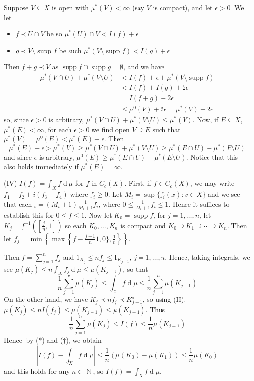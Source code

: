 \documentclass[11pt, a4paper]{memoir}
\DeclareMathOperator{\N}{{\mathbb{N}}}
\newcommand{\ol}[1]{\ensuremath{\overline{#1}}}
\theoremstyle{change}
\theoremstyle{plain}
\theoremstyle{nonumberplain}
\DeclareMathOperator{\supp}{supp}
\renewcommand{\d}[1]{\ensuremath{\operatorname{d}\!{#1}}}
\numberwithin{equation}{section}
\begin{document}
Suppose $V\subseteq X$ is open with $\mu^*(V)<\infty$ (say $\ol{V}$ is compact), and let $\epsilon>0$.
We let
\begin{itemize}[nl]
    \item $f\prec U\cap V$ be so $\mu^*(U)\cap V<I(f)+\epsilon$
    \item $g\prec V\setminus\supp f$ be such $\mu^*(V\setminus\supp f)< I(g)+\epsilon$
\end{itemize}
Then $f+g\prec V$ as $\supp f\cap\supp g=\emptyset$, and we have
\begin{align*}
    \mu^*(V\cap U)+\mu^*(V\setminus U) &< I(f)+\epsilon+\mu^*(V\setminus\supp f)\\
                                       &< I(f)+I(g)+2\epsilon\\
                                       &= I(f+g)+2\epsilon\\
                                       &\leq \mu^0(V)+2\epsilon=\mu^*(V)+2\epsilon
\end{align*}
so, since $\epsilon>0$ is arbitrary, $\mu^*(V\cap U)+\mu^*(V\setminus U)\leq\mu^*(V)$.
Now, if $E\subseteq X$, $\mu^*(E)<\infty$, for each $\epsilon>0$ we find open $V\supseteq E$ such that $\mu^*(V)=\mu^0(E)<\mu^*(E)+\epsilon$.
Then
\begin{equation*}
    \mu^*(E)+\epsilon > \mu^*(V) \geq \mu^*(V\cap U)+\mu^*(V\setminus U)\geq\mu^*(E\cap U)+\mu^*(E\setminus U)
\end{equation*}
and since $\epsilon$ is arbitrary, $\mu^0(E)\geq\mu^*(E\cap U)+\mu^*(E\setminus U)$.
Notice that this also holds immediately if $\mu^*(E)=\infty$.

(IV) $I(f)=\int_X f\d{\mu}$ for $f$ in $C_c(X)$.
First, if $f\in C_c(X)$, we may write $f_1-f_2+i(f_3-f_4)$ where $f_i\geq 0$.
Let $M_i=\sup\{f_i(x):x\in X\}$ and we see that each $_i=(M_i+1)\frac{1}{M_i+1}f_i$, where $0\leq\frac{1}{M_i+1}f_i\leq 1$.
Hence it suffices to establish this for $0\leq f\leq 1$.
Now let $K_0=\supp f$, for $j=1,\ldots,n$, let $K_j=f^{-1}\left(\left[\frac{j}{n},1\right]\right)$ so each $K_0,\ldots,K_n$ is compact and $K_0\supseteq K_1\supseteq\cdots\supseteq K_n$.
Then let $f_j=\min\left\{\max\left\{f-\frac{j-1}{n}1,0\},\frac{1}{n}\right\}\right\}$.

Then $f=\sum_{j=1}^n f_j$ and $1_{K_j}\leq nf_j\leq 1_{K_{j-1}}$, $j=1,\ldots,n$.
Hence, taking integrals, we see $\mu(K_j)\leq n\int_X f_j\d{\mu}\leq \mu(K_{j-1})$, so that
\begin{equation*}
    \frac{1}{n}\sum_{j=1}^n\mu(K_j)\leq \int_X f\d{\mu}\leq\frac{1}{n}\sum_{j=1}^n\mu(K_{j-1})\tag{$*$}
\end{equation*}
On the other hand, we have $K_j\prec nf_j\prec K_{j-1}^\circ$, so using (II), $\mu(K_j)\leq nI(f_j)\leq\mu(K_{j-1}^\circ)\leq\mu(K_{j-1})$.
Thus
\begin{equation*}
    \frac{1}{n}\sum_{j=1}^n\mu(K_j)\leq I(f)\leq\frac{1}{n}\mu(K_{j-1})\tag{$\dagger$}
\end{equation*}
Hence, by ($*$) and ($\dagger$), we obtain
\begin{equation*}
    |I(f)-\int_X f\d{\mu}|\leq\frac{1}{n}(\mu(K_0)-\mu(K_1))\leq\frac{1}{n}\mu(K_0)
\end{equation*}
and this holds for any $n\in\N$, so $I(f)=\int_X f\d{\mu}$.
\end{document}

